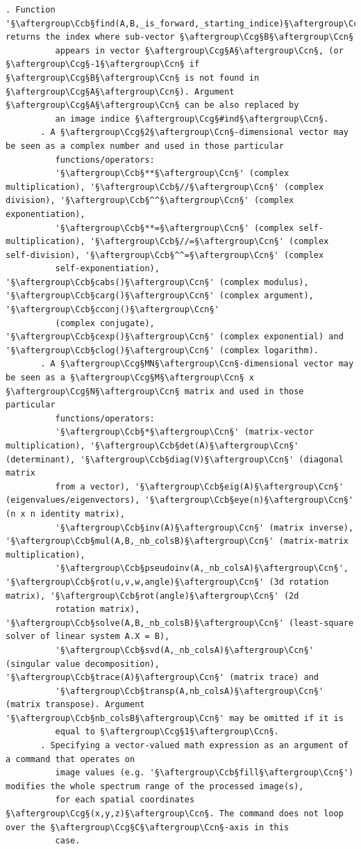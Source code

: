\documentclass[a4paper,10.5pt,twoside]{book}
\def\Ccb{\color{cb}}
\def\Ccg{\color{cc}}
\def\Ccn{\color{black}}
\begin{document}
\begin{lstlisting}[escapechar=§]
       . Function '§\aftergroup\Ccb§find(A,B,_is_forward,_starting_indice)§\aftergroup\Ccn§' returns the index where sub-vector §\aftergroup\Ccg§B§\aftergroup\Ccn§ 
          appears in vector §\aftergroup\Ccg§A§\aftergroup\Ccn§, (or §\aftergroup\Ccg§-1§\aftergroup\Ccn§ if §\aftergroup\Ccg§B§\aftergroup\Ccn§ is not found in §\aftergroup\Ccg§A§\aftergroup\Ccn§). Argument §\aftergroup\Ccg§A§\aftergroup\Ccn§ can be also replaced by 
          an image indice §\aftergroup\Ccg§#ind§\aftergroup\Ccn§. 
       . A §\aftergroup\Ccg§2§\aftergroup\Ccn§-dimensional vector may be seen as a complex number and used in those particular 
          functions/operators: 
          '§\aftergroup\Ccb§**§\aftergroup\Ccn§' (complex multiplication), '§\aftergroup\Ccb§//§\aftergroup\Ccn§' (complex division), '§\aftergroup\Ccb§^^§\aftergroup\Ccn§' (complex exponentiation), 
          '§\aftergroup\Ccb§**=§\aftergroup\Ccn§' (complex self-multiplication), '§\aftergroup\Ccb§//=§\aftergroup\Ccn§' (complex self-division), '§\aftergroup\Ccb§^^=§\aftergroup\Ccn§' (complex 
          self-exponentiation), '§\aftergroup\Ccb§cabs()§\aftergroup\Ccn§' (complex modulus), '§\aftergroup\Ccb§carg()§\aftergroup\Ccn§' (complex argument), '§\aftergroup\Ccb§cconj()§\aftergroup\Ccn§' 
          (complex conjugate), '§\aftergroup\Ccb§cexp()§\aftergroup\Ccn§' (complex exponential) and '§\aftergroup\Ccb§clog()§\aftergroup\Ccn§' (complex logarithm). 
       . A §\aftergroup\Ccg§MN§\aftergroup\Ccn§-dimensional vector may be seen as a §\aftergroup\Ccg§M§\aftergroup\Ccn§ x §\aftergroup\Ccg§N§\aftergroup\Ccn§ matrix and used in those particular 
          functions/operators: 
          '§\aftergroup\Ccb§*§\aftergroup\Ccn§' (matrix-vector multiplication), '§\aftergroup\Ccb§det(A)§\aftergroup\Ccn§' (determinant), '§\aftergroup\Ccb§diag(V)§\aftergroup\Ccn§' (diagonal matrix 
          from a vector), '§\aftergroup\Ccb§eig(A)§\aftergroup\Ccn§' (eigenvalues/eigenvectors), '§\aftergroup\Ccb§eye(n)§\aftergroup\Ccn§' (n x n identity matrix), 
          '§\aftergroup\Ccb§inv(A)§\aftergroup\Ccn§' (matrix inverse), '§\aftergroup\Ccb§mul(A,B,_nb_colsB)§\aftergroup\Ccn§' (matrix-matrix multiplication), 
          '§\aftergroup\Ccb§pseudoinv(A,_nb_colsA)§\aftergroup\Ccn§', '§\aftergroup\Ccb§rot(u,v,w,angle)§\aftergroup\Ccn§' (3d rotation matrix), '§\aftergroup\Ccb§rot(angle)§\aftergroup\Ccn§' (2d 
          rotation matrix), '§\aftergroup\Ccb§solve(A,B,_nb_colsB)§\aftergroup\Ccn§' (least-square solver of linear system A.X = B), 
          '§\aftergroup\Ccb§svd(A,_nb_colsA)§\aftergroup\Ccn§' (singular value decomposition), '§\aftergroup\Ccb§trace(A)§\aftergroup\Ccn§' (matrix trace) and 
          '§\aftergroup\Ccb§transp(A,nb_colsA)§\aftergroup\Ccn§' (matrix transpose). Argument '§\aftergroup\Ccb§nb_colsB§\aftergroup\Ccn§' may be omitted if it is 
          equal to §\aftergroup\Ccg§1§\aftergroup\Ccn§. 
       . Specifying a vector-valued math expression as an argument of a command that operates on 
          image values (e.g. '§\aftergroup\Ccb§fill§\aftergroup\Ccn§') modifies the whole spectrum range of the processed image(s), 
          for each spatial coordinates §\aftergroup\Ccg§(x,y,z)§\aftergroup\Ccn§. The command does not loop over the §\aftergroup\Ccg§C§\aftergroup\Ccn§-axis in this 
          case. 
 

\end{lstlisting}
\end{document}
